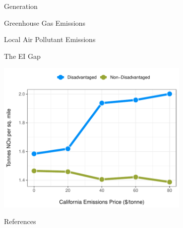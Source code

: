 \documentclass[11pt, aspectratio = 169]{beamer}
\begin{document}


\begin{frame}{Generation}
    
\end{frame}


\begin{frame}{Greenhouse Gas Emissions}
    
\end{frame}


\begin{frame}{Local Air Pollutant Emissions}
    
\end{frame}


\begin{frame}{The EI Gap}

    \centering
    \includegraphics[width = 0.7\textwidth]{figures/chapter5_figures/ei_gap_bca_nox.pdf}

\end{frame}








\begin{frame}[allowframebreaks]{References}
\footnotesize



\end{frame}
\end{document}

